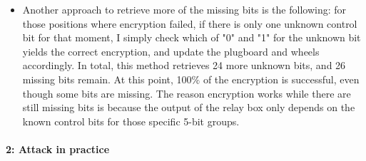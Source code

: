 \documentclass{article}
\begin{document}
\begin{enumerate}
\begin{itemize}
\begin{itemize}
            \item Another approach to retrieve more of the missing bits is the following: for those positions where encryption failed,
            if there is only one unknown control bit for that moment, I simply check which of "0" and "1" for the unknown bit yields the correct encryption, and update the plugboard and wheels accordingly.
            In total, this method retrieves 24 more unknown bits, and 26 missing bits remain.
            At this point, 100$\%$ of the encryption is successful, even though some bits are missing. The reason encryption works while
            there are still missing bits is because the output of the relay box only depends on the known 
            control bits for those specific 5-bit groups.
        \end{itemize}

    \end{itemize}
\end{enumerate}
\paragraph{2: Attack in practice}
\end{document}
